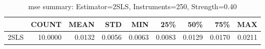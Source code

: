\begin{table}[ht]
\centering
\caption{mse summary: Estimator=2SLS, Instruments=250, Strength=0.40}
\begin{tabular}{lrrrrrrrr}
\toprule
 & COUNT & MEAN & STD & MIN & 25\% & 50\% & 75\% & MAX \\
\midrule
2SLS & 10.0000 & 0.0132 & 0.0056 & 0.0063 & 0.0083 & 0.0129 & 0.0170 & 0.0211 \\
\bottomrule
\end{tabular}
\end{table}
